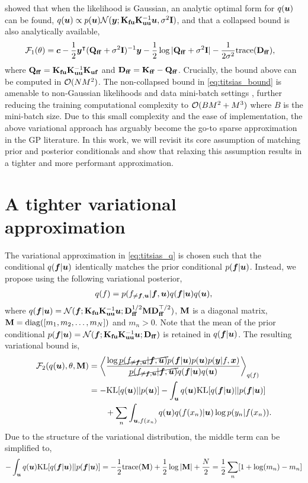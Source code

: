\cite{titsias2009variational} showed that when the likelihood is Gaussian, an analytic optimal form for $q({\bm{u}})$ can be found, $q({\bm{u}}) \propto p({\bm{u}}) {\mathcal{N}}({\bm{y}}; \mathbf{K}_{\mathbf{fu}}\mathbf{K}_{\mathbf{uu}}^{-1}{\bm{u}}, \sigma^2{\mathbf{I}})$, and that a collapsed bound is also analytically available,
\begin{align}
    {\mathcal{F}}_1(\theta) &= {\bm{c}} - \frac{1}{2} {\bm{y}}^\intercal (\mathbf{Q}_{\mathbf{ff}} + \sigma^2{\mathbf{I}})^{-1} {\bm{y}} - \frac{1}{2} \log |\mathbf{Q}_{\mathbf{ff}} + \sigma^2{\mathbf{I}}| - \frac{1}{2\sigma^2} \mathrm{trace} (\mathbf{D}_{\mathbf{ff}}), \label{titsias_collapsed}
\end{align}
where $\mathbf{Q}_{\mathbf{ff}} = \mathbf{K}_{\mathbf{fu}}\mathbf{K}_{\mathbf{uu}}^{-1}\mathbf{K}_{\mathbf{uf}}$ and $\mathbf{D}_{\mathbf{ff}} = \mathbf{K}_{\mathbf{ff}} - \mathbf{Q}_{\mathbf{ff}}$. Crucially, the bound above can be computed in ${\mathcal{O}}(NM^2)$. The non-collapsed bound in \cref{eq:titsias_bound} is amenable to non-Gaussian likelihoods and data mini-batch settings \citep[see e.g.,][]{hensman2015scalable}, further reducing the training computational complexity to ${\mathcal{O}}(BM^2 + M^3)$ where $B$ is the mini-batch size. Due to this small complexity and the ease of implementation, the above variational approach has arguably become the go-to sparse approximation in the GP literature. In this work, we will revisit its core assumption of matching prior and posterior conditionals and show that relaxing this assumption results in a tighter and more performant approximation.

\section{A tighter variational approximation}
\label{sec:tighter_approx}
The variational approximation in \cref{eq:titsias_q} is chosen such that the conditional $q({\bm{f}} | {\bm{u}})$ identically matches the prior conditional $p({\bm{f}} | {\bm{u}})$. Instead, we propose using the following variational posterior,
\begin{align}
    q(f) = p(f_{\neq {\bm{f}}, {\bm{u}}} | {\bm{f}}, {\bm{u}}) q({\bm{f}} | {\bm{u}}) q({\bm{u}}), \label{eq:tighter_q}
\end{align}
where $q({\bm{f}} | {\bm{u}}) = {\mathcal{N}}({\bm{f}}; \mathbf{K}_{\mathbf{fu}}\mathbf{K}_{\mathbf{uu}}^{-1}{\bm{u}}; \mathbf{D}_{\mathbf{ff}}^{1/2}{\mathbf{M}} \mathbf{D}_{\mathbf{ff}}^{\top/2})$, ${\mathbf{M}}$ is a diagonal matrix, ${\mathbf{M}} = \mathrm{diag}([m_1, m_2, \dots, m_N])$ and $m_n > 0$. Note that the mean of the prior conditional $p({\bm{f}} | {\bm{u}}) = {\mathcal{N}}({\bm{f}}; \mathbf{K}_{\mathbf{fu}}\mathbf{K}_{\mathbf{uu}}^{-1}{\bm{u}}; \mathbf{D}_{\mathbf{ff}})$ is retained in $q({\bm{f}} | {\bm{u}})$. The resulting variational bound is,
\begin{align}
    {\mathcal{F}}_2(q({\bm{u}}), \theta, {\mathbf{M}}) 
        &= \left \langle \frac {\log \cancel{p(f_{\neq {\bm{f}}, {\bm{u}}} | {\bm{f}}, {\bm{u}})} p({\bm{f}} | {\bm{u}}) p({\bm{u}}) p({\bm{y}} | f, {\bm{x}}) } {\cancel{p(f_{\neq {\bm{f}}, {\bm{u}}} | {\bm{f}}, {\bm{u}})} q({\bm{f}} | {\bm{u}}) q({\bm{u}})} \right \rangle_{q(f)} \nonumber \\
        &= - \mathrm{KL} [q({\bm{u}}) || p({\bm{u}})] - \int_{\bm{u}} q({\bm{u}}) \mathrm{KL} [q({\bm{f}} | {\bm{u}}) || p({\bm{f}} | {\bm{u}})] \nonumber \\ & \qquad +  \sum_{n} \int_{{\bm{u}}, f(x_n)} q({\bm{u}}) q(f({x_n}) | {\bm{u}}) \log p(y_n | f({x_n})). \label{eq:tighter_uncollapsed}
\end{align}
Due to the structure of the variational distribution, the middle term can be simplified to,
\begin{align}
    - \int_{\bm{u}} q({\bm{u}}) \mathrm{KL} [q({\bm{f}} | {\bm{u}}) || p({\bm{f}} | {\bm{u}})]
    = - \frac{1}{2} \mathrm{trace}({\mathbf{M}}) + \frac{1}{2}\log |{\mathbf{M}}| + \frac{N}{2} = \frac{1}{2}\sum_n [1 + \log(m_n) - m_n] \nonumber
\end{align}
